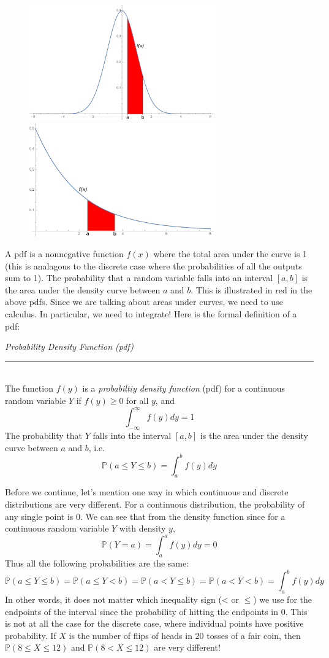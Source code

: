 \documentclass[12pt]{article}
\theoremstyle{definition}
\theoremstyle{remark}
\def\P{{\mathbb P}}
\begin{document}
\begin{figure}[H]
\centering
\includegraphics[width=8cm]{normalpdf}
\includegraphics[width=8cm]{exppdf}
\end{figure}

A pdf is a nonnegative function $f(x)$ where the total area under the curve is 1 (this is analagous to the discrete case where the probabilities of all the outputs sum to 1). The probability that a random variable falls into an interval $[a, b]$ is the area under the density curve between $a$ and $b$. This is illustrated in red in the above pdfs. Since we are talking about areas under curves, we need to use calculus. In particular, we need to integrate! Here is the formal definition of a pdf:

\begin{framed}
\emph{Probability Density Function (pdf)}\\
  \rule{\dimexpr{}\fboxrule}{.1pt} \\
The function $f(y)$ is a \emph{probabiltiy density function} (pdf) for a continuous random variable $Y$ if $f(y) \geq 0$ for all $y$, and
\[
\int_{-\infty}^\infty f(y) dy = 1
\]
The probability that $Y$ falls into the interval $[a, b]$ is the area under the density curve between $a$ and $b$, i.e.
\[
\P(a \leq Y \leq b) = \int_a^b f(y) dy
\]
\end{framed}

Before we continue, let's mention one way in which continuous and discrete distributions are very different. For a continuous distribution, the probability of any single point is 0. We can see that from the density function since for a continuous random variable $Y$ with density $y$,
\[
\P(Y = a) = \int_a^a f(y) dy = 0
\]
Thus all the following probabilities are the same:
\[
\P(a \leq Y \leq b) = \P(a \leq Y < b) = \P(a < Y \leq b) = \P(a < Y < b) = \int_a^b f(y) dy
\]
In other words, it does not matter which inequality sign (< or $\leq$) we use for the endpoints of the interval since the probability of hitting the endpoints in 0. This is not at all the case for the discrete case, where individual points have positive probability. If $X$ is the number of flips of heads in 20 tosses of a fair coin, then $\P(8 \leq X \leq 12)$ and $\P(8 < X \leq 12)$ are very different!
\end{document}
